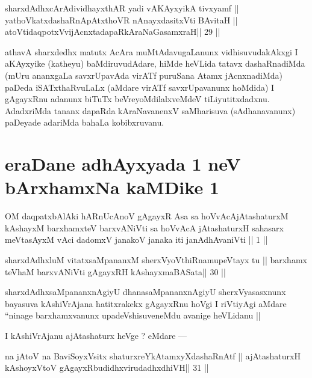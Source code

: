 \begin{shl}
sharxdAdhxcArAdividhayxthAR yadi vA\s\s KAyxyikA tivxyamf ||
yathoVkatxdashaRnApAtxthoVR nAnayxdasitxVti BAvitaH ||
atoV\s tidaqpotxV\s vijAcnxtadapaRkAraNaGasamxraH\hfill || 29 ||
\end{shl}

\begin{artha}
athavA sharxdedhx matutx AcAra muMtAdavugaLanunx vidhisuvudakAkxgi I aKAyxyike (katheyu) baMdiruvudAdare, hiMde heVLida tatavx dashaRnadiMda (mUru ananxgaLa savxrUpavAda virATf puruSana Atamx jAcnxnadiMda) paDeda iSATxthaRvuLaLx (aMdare virATf savxrUpavanunx hoMdida) I gAgayxRnu adanunx biTuTx beVreyoMdilalxveMdeV tiLiyutitxdadxnu. AdadxriMda tananx dapaRda kAraNavanenxV saMharisuva (sAdhanavanunx) paDeyade adariMda bahaLa kobibxruvanu.
\end{artha}

\section*{eraDane adhAyxyada 1 neV bArxhamxNa kaMDike 1}

\begin{shl}
OM daqpatxbAlAki hARnUcAnoV gAgayxR Asa
sa hoVvAcAjAtashaturxM kAshayxM barxhamxteV barxvANiVti
sa hoVvAcA jAtashaturxH sahasarx meVtasAyxM vAci
dadomxV janakoV janaka iti janAdhAvaniVti || 1 ||
\end{shl}

\begin{shl}
sharxdAdhxluM vitatxsaMpananxM sherxVyoVthiRnamupeVtayx tu ||
barxhamx teV\s haM barxvANiVti gAgayxRH kAshayxmaBASata\hfill || 30 ||
\end{shl}

\begin{artha}
sharxdAdhxsaMpananxnAgiyU dhanasaMpananxnAgiyU sherxVyasasxnunx bayasuva kAshiVrAjana hatitxrakekx gAgayxRnu hoVgi I riVtiyAgi aMdare ``ninage barxhamxvanunx upadeVshisuveneMdu avanige heVLidanu ||
\end{artha}

\begin{artha}
I kAshiVrAjanu ajAtashaturx heVge ? eMdare ---
\end{artha} 

\begin{shl}
na jAtoV na BaviSoyxV\s sitx shaturxreYkAtamxyXdashaRnAtf ||
ajAtashaturxH kAshoyxV\s toV gAgayxRbudidhxvirudadhxdhiVH\hfill || 31 ||
\end{shl}

